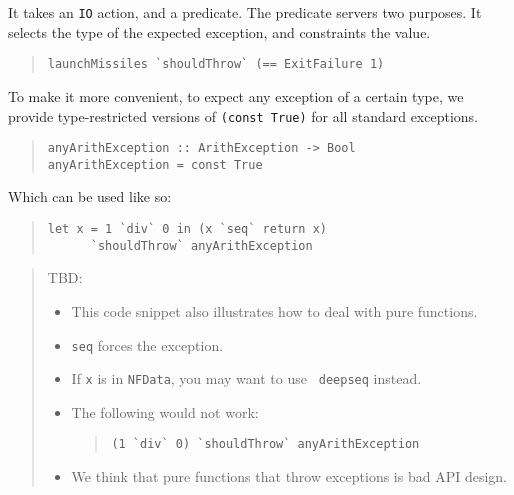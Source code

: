 \documentclass[preprint]{sigplanconf}
\begin{document}
\noindent It takes an {\tt IO} action, and a predicate.  The predicate
servers two purposes.  It selects the type of the expected exception,
and constraints the value.

\begin{quote}\small\begin{verbatim}
launchMissiles `shouldThrow` (== ExitFailure 1)
\end{verbatim}\end{quote}

\noindent To make it more convenient, to expect any exception of a
certain type, we provide type-restricted versions of {\tt (const
True)} for all standard exceptions.

\begin{quote}\small\begin{verbatim}
anyArithException :: ArithException -> Bool
anyArithException = const True
\end{verbatim}\end{quote}

\noindent Which can be used like so:

\begin{quote}\small\begin{verbatim}
let x = 1 `div` 0 in (x `seq` return x)
      `shouldThrow` anyArithException
\end{verbatim}\end{quote}


\begin{quote}
    TBD:
    \begin{itemize}
        \item
            This code snippet also illustrates how to deal with pure
            functions.
        \item
            {\tt seq} forces the exception.
        \item
            If {\tt x} is in {\tt NFData}, you may want to use {\tt
            deepseq} instead.
        \item
            The following would not work:
\begin{quote}\small\begin{verbatim}
(1 `div` 0) `shouldThrow` anyArithException
\end{verbatim}\end{quote}
        \item
            We think that pure functions that throw exceptions is bad
            API design.
    \end{itemize}
\end{quote}
\end{document}
